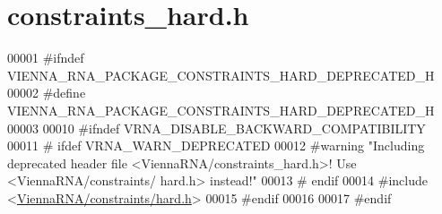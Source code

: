 \hypertarget{constraints__hard_8h_source}{}\section{constraints\+\_\+hard.\+h}
\label{constraints__hard_8h_source}

\begin{DoxyCode}
00001 \textcolor{preprocessor}{#ifndef VIENNA\_RNA\_PACKAGE\_CONSTRAINTS\_HARD\_DEPRECATED\_H}
00002 \textcolor{preprocessor}{#define VIENNA\_RNA\_PACKAGE\_CONSTRAINTS\_HARD\_DEPRECATED\_H}
00003 
00010 \textcolor{preprocessor}{#ifndef VRNA\_DISABLE\_BACKWARD\_COMPATIBILITY}
00011 \textcolor{preprocessor}{# ifdef VRNA\_WARN\_DEPRECATED}
00012 \textcolor{preprocessor}{#warning "Including deprecated header file <ViennaRNA/constraints\_hard.h>! Use <ViennaRNA/constraints/
      hard.h> instead!"}
00013 \textcolor{preprocessor}{# endif}
00014 \textcolor{preprocessor}{#include <\hyperlink{hard_8h}{ViennaRNA/constraints/hard.h}>}
00015 \textcolor{preprocessor}{#endif}
00016 
00017 \textcolor{preprocessor}{#endif}
\end{DoxyCode}

